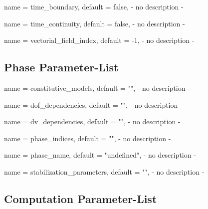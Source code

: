 \begin{parameter}{
    name    = {time_boundary},
    default = {false},
}
- no description -
\end{parameter}

\begin{parameter}{
    name    = {time_continuity},
    default = {false},
}
- no description -
\end{parameter}

\begin{parameter}{
    name    = {vectorial_field_index},
    default = {-1},
}
- no description -
\end{parameter}

\subsection{Phase Parameter-List}

\begin{parameter}{
    name    = {constitutive_models},
    default = {""},
}
- no description -
\end{parameter}

\begin{parameter}{
    name    = {dof_dependencies},
    default = {""},
}
- no description -
\end{parameter}

\begin{parameter}{
    name    = {dv_dependencies},
    default = {""},
}
- no description -
\end{parameter}

\begin{parameter}{
    name    = {phase_indices},
    default = {""},
}
- no description -
\end{parameter}

\begin{parameter}{
    name    = {phase_name},
    default = {"undefined"},
}
- no description -
\end{parameter}

\begin{parameter}{
    name    = {stabilization_parameters},
    default = {""},
}
- no description -
\end{parameter}

\subsection{Computation Parameter-List}

